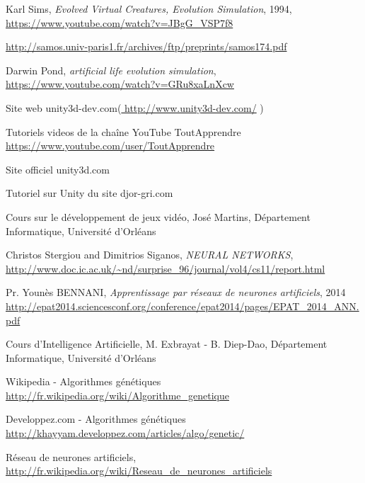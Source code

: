\begin{thebibliography}{99}

Karl Sims,
 \emph{Evolved Virtual Creatures, Evolution Simulation}, 1994,
 \url{https://www.youtube.com/watch?v=JBgG\_VSP7f8}

 \url{http://samos.univ-paris1.fr/archives/ftp/preprints/samos174.pdf}

Darwin Pond,
\emph{artificial life evolution simulation},
\url{https://www.youtube.com/watch?v=GRu8xaLnXcw}


 Site web unity3d-dev.com(\url{ http://www.unity3d-dev.com/}  )

Tutoriels videos de la chaîne YouTube ToutApprendre \url{https://www.youtube.com/user/ToutApprendre}

Site officiel unity3d.com

Tutoriel sur Unity du site djor-gri.com

Cours sur le développement de jeux vidéo, José Martins, Département Informatique, Université d'Orléans

Christos Stergiou and Dimitrios Siganos,
\emph{NEURAL NETWORKS}, 
\url{http://www.doc.ic.ac.uk/~nd/surprise_96/journal/vol4/cs11/report.html}

Pr. Younès BENNANI,
\emph{Apprentissage par réseaux de neurones artificiels}, 2014
\url{http://epat2014.sciencesconf.org/conference/epat2014/pages/EPAT_2014_ANN.pdf}

Cours d'Intelligence Artificielle, M. Exbrayat - B. Diep-Dao, Département Informatique, Université d'Orléans

Wikipedia - Algorithmes génétiques \url{http://fr.wikipedia.org/wiki/Algorithme_genetique}

Developpez.com - Algorithmes génétiques
 \url{http://khayyam.developpez.com/articles/algo/genetic/}

Réseau de neurones artificiels,
 \url{http://fr.wikipedia.org/wiki/Reseau_de_neurones_artificiels}

\end{thebibliography}
